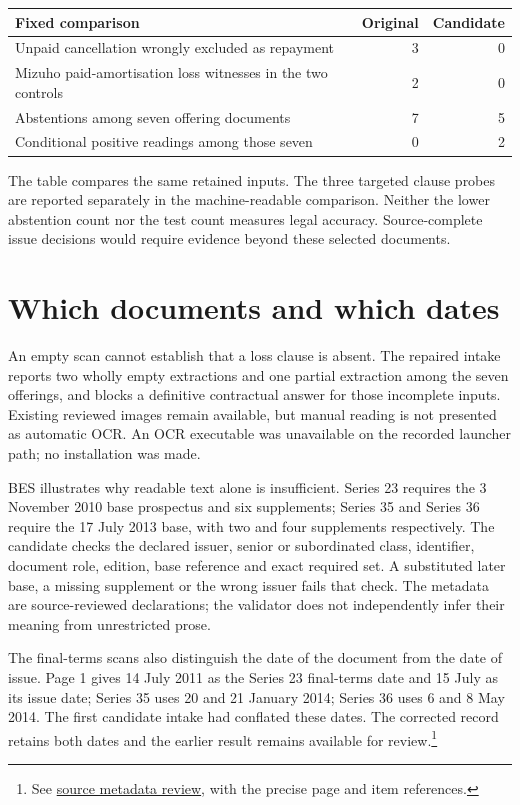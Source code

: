 \documentclass[11pt,a4paper]{article}
\begin{document}
\begin{center}
\begin{tabularx}{\linewidth}{@{}Xrr@{}}
\toprule
Fixed comparison & Original & Candidate\\
\midrule
Unpaid cancellation wrongly excluded as repayment & 3 & 0\\
Mizuho paid-amortisation loss witnesses in the two controls & 2 & 0\\
Abstentions among seven offering documents & 7 & 5\\
Conditional positive readings among those seven & 0 & 2\\
\bottomrule
\end{tabularx}
\end{center}

The table compares the same retained inputs. The three targeted clause probes
are reported separately in the machine-readable comparison. Neither the lower
abstention count nor the test count measures legal accuracy. Source-complete
issue decisions would require evidence beyond these selected documents.

\section*{Which documents and which dates}

An empty scan cannot establish that a loss clause is absent. The repaired intake
reports two wholly empty extractions and one partial extraction among the seven
offerings, and blocks a definitive contractual answer for those incomplete
inputs. Existing reviewed images remain available, but manual reading is not
presented as automatic OCR. An OCR executable was unavailable on the recorded
launcher path; no installation was made.

BES illustrates why readable text alone is insufficient. Series 23 requires
the 3 November 2010 base prospectus and six supplements; Series 35 and Series 36
require the 17 July 2013 base, with two and four supplements respectively.
The candidate checks the declared issuer, senior or subordinated class,
identifier, document role, edition, base reference and exact required set.
A substituted later base, a missing supplement or the wrong issuer fails that
check. The metadata are source-reviewed declarations; the validator does not
independently infer their meaning from unrestricted prose.

The final-terms scans also distinguish the date of the document from the date
of issue. Page 1 gives 14 July 2011 as the Series 23 final-terms date and
15 July as its issue date; Series 35 uses 20 and 21 January 2014; Series 36 uses
6 and 8 May 2014. The first candidate intake had conflated these dates.
The corrected record retains both dates and the earlier result remains
available for review.\footnote{See \href{SOURCE-REVIEW.md}{source metadata review}, with the precise page and item references.}
\end{document}
